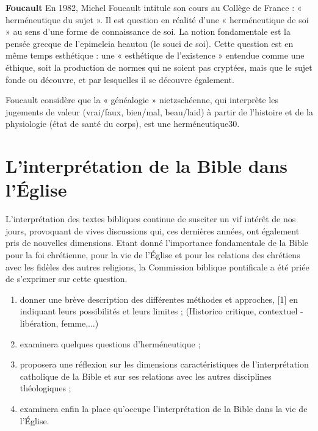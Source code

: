 \textbf{Foucault}
En 1982, Michel Foucault intitule son cours au Collège de France : « herméneutique du sujet ». Il est question en réalité d’une « herméneutique de soi » au sens d’une forme de connaissance de soi. La notion fondamentale est la pensée grecque de l'epimeleia heautou (le souci de soi). Cette question est en même temps esthétique : une « esthétique de l’existence » entendue comme une éthique, soit la production de normes qui ne soient pas cryptées, mais que le sujet fonde ou découvre, et par lesquelles il se découvre également.

Foucault considère que la « généalogie » nietzschéenne, qui interprète les jugements de valeur (vrai/faux, bien/mal, beau/laid) à partir de l'histoire et de la physiologie (état de santé du corps), est une herméneutique30.


\section{L'interprétation de la Bible dans l'Église}

L'interprétation des textes bibliques continue de susciter un vif intérêt de nos jours, provoquant de vives discussions qui, ces dernières années, ont également pris de nouvelles dimensions. Etant donné l'importance fondamentale de la Bible pour la foi chrétienne, pour la vie de l'Église et pour les relations des chrétiens avec les fidèles des autres religions, la Commission biblique pontificale a été priée de s'exprimer sur cette question.  
 
  \begin{enumerate}
      \item donner une brève description des différentes méthodes et approches, [1] en indiquant leurs possibilités et leurs limites ;  (Historico critique, contextuel -  libération, femme,...)

      \item examinera quelques questions d'herméneutique ; 

      \item proposera une réflexion sur les dimensions caractéristiques de l'interprétation catholique de la Bible et sur ses relations avec les autres disciplines théologiques ; 

      \item examinera enfin la place qu'occupe l'interprétation de la Bible dans la vie de l'Église.    
  \end{enumerate}
 

